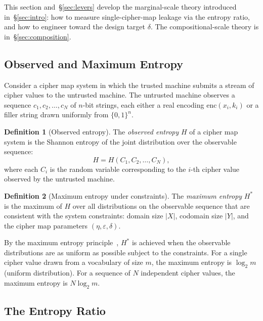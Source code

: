 \documentclass[11pt]{article}
\theoremstyle{definition}
\newtheorem{definition}{Definition}[section]
\theoremstyle{plain}
\theoremstyle{remark}
\newcommand{\enc}{\mathrm{enc}}
\newcommand{\B}{\{0,1\}}
\begin{document}
This section and~\S\ref{sec:levers} develop the marginal-scale theory
introduced in~\S\ref{sec:intro}: how to measure single-cipher-map
leakage via the entropy ratio, and how to engineer toward the design
target $\delta$.  The compositional-scale theory is in~\S\ref{sec:composition}.

\subsection{Observed and Maximum Entropy}

Consider a cipher map system in which the trusted machine submits a
stream of cipher values to the untrusted machine.  The untrusted machine
observes a sequence $c_1, c_2, \ldots, c_N$ of $n$-bit strings, each
either a real encoding $\enc(x_i, k_i)$ or a filler string drawn
uniformly from $\B^n$.

\begin{definition}[Observed entropy]
\label{def:observed-entropy}
The \emph{observed entropy} $H$ of a cipher map system is the Shannon
entropy of the joint distribution over the observable sequence:
\begin{equation}
H = H(C_1, C_2, \ldots, C_N),
\end{equation}
where each $C_i$ is the random variable corresponding to the $i$-th
cipher value observed by the untrusted machine.
\end{definition}

\begin{definition}[Maximum entropy under constraints]
\label{def:max-entropy}
The \emph{maximum entropy} $H^*$ is the maximum of $H$ over all
distributions on the observable sequence that are consistent with the
system constraints: domain size $|X|$, codomain size $|Y|$, and the
cipher map parameters $(\eta, \varepsilon, \delta)$.
\end{definition}

By the maximum entropy principle~\cite{jaynes1957information}, $H^*$ is
achieved when the observable distributions are as uniform as possible
subject to the constraints.  For a single cipher value drawn from a
vocabulary of size $m$, the maximum entropy is $\log_2 m$ (uniform
distribution).  For a sequence of $N$ independent cipher values, the
maximum entropy is $N \log_2 m$.

\subsection{The Entropy Ratio}
\end{document}
